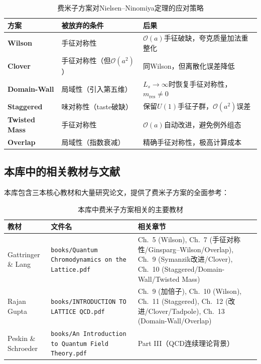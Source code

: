 \documentclass[12pt,a4paper]{ctexart}
\theoremstyle{definition}
\begin{document}
\begin{table}[H]
\centering
\caption{费米子方案对Nielsen--Ninomiya定理的应对策略}
\label{tab:NN_theorem_strategies}
\begin{tabular}{lp{4.5cm}p{5.5cm}}
\toprule
方案 & 被放弃的条件 & 后果 \\
\midrule
\textbf{Wilson} & 手征对称性 & $\mathcal{O}(a)$手征破缺，夸克质量加法重整化 \\
\textbf{Clover} & 手征对称性（但$\mathcal{O}(a^2)$） & 同Wilson，但离散化误差降低 \\
\textbf{Domain-Wall} & 局域性（引入第五维） & $L_s\to\infty$时恢复手征对称性，$m_{\text{res}}\neq 0$ \\
\textbf{Staggered} & 味对称性（taste破缺） & 保留$U(1)$手征子群，$\mathcal{O}(a^2)$误差 \\
\textbf{Twisted Mass} & 手征对称性 & $\mathcal{O}(a)$自动改进，避免例外组态 \\
\textbf{Overlap} & 局域性（指数衰减） & 精确手征对称性，极高计算成本 \\
\bottomrule
\end{tabular}
\end{table}

\subsection{本库中的相关教材与文献}

本库包含三本核心教材和大量研究论文，提供了费米子方案的全面参考：

\begin{table}[H]
\centering
\caption{本库中费米子方案相关的主要教材}
\label{tab:textbooks}
\small
\begin{tabular}{lp{6cm}l}
\toprule
教材 & 文件名 & 相关章节 \\
\midrule
Gattringer \& Lang & \texttt{books/Quantum Chromodynamics on the Lattice.pdf} &
Ch.~5 (Wilson), Ch.~7 (手征对称性/Ginsparg--Wilson/Overlap), Ch.~9 (Symanzik改进/Clover), Ch.~10 (Staggered/Domain-Wall/Twisted Mass) \\

Rajan Gupta & \texttt{books/INTRODUCTION TO LATTICE QCD.pdf} &
Ch.~9 (加倍子), Ch.~10 (Wilson), Ch.~11 (Staggered), Ch.~12 (改进/Clover/Tadpole), Ch.~13 (Domain-Wall/Overlap) \\

Peskin \& Schroeder & \texttt{books/An Introduction to Quantum Field Theory.pdf} &
Part III（QCD连续理论背景）\\
\bottomrule
\end{tabular}
\end{table}
\end{document}
